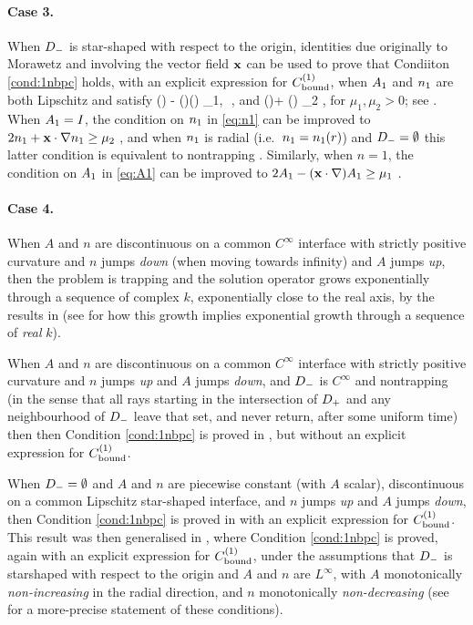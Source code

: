 \paragraph{Case 3.}
When $D_{-}$ is star-shaped with respect to the origin, identities due originally to Morawetz and involving the vector field $\mathbf{x}$ can be used to prove that Condiiton \ref{cond:1nbpc} holds, with an explicit expression for $C^{(1)}_{\rm bound}$, when $A_{1}$ and $n_{1}$ are both Lipschitz and satisfy
\beq\label{eq:A1}
\Ao(\bx) - (\bx\cdot\nabla)\Ao(\bx) \geq \mu_1,\,\, \bx\in \Dp,
\eeq
and 
\beq\label{eq:n1}
\no(\bx)+ \bx\cdot\nabla \no(\bx) \geq \mu_2 \quad{}\bx\in \Dp,
\eeq
for $\mu_1, \mu_2>0$;
see \cite[Theorem 2.5]{GrPeSp:19}. When $A_{1}= I$, the condition on $n_{1}$ in \eqref{eq:n1} can be improved to $2n_{1} + \mathbf{x} \cdot \nabla n_{1} \geq \mu_2$ \cite[Theorem 2.19(ii)]{GrPeSp:19}, and when $n_{1}$ is radial (i.e.~$n_{1}= n_{1}(r)$) and $D_{-}=\emptyset$ this latter condition is equivalent to nontrapping \cite[Theorem 7.7]{GrPeSp:19}.
Similarly, when $n= 1$, the condition on $A_{1}$ in \eqref{eq:A1} can be improved to $2A_{1} - (\mathbf{x}\cdot\nabla)A_{1} \geq \mu_1$
\cite[Theorem 2.19(i)]{GrPeSp:19}.

\paragraph{Case 4.}
When $A$ and $n$ are discontinuous on a common $C^\infty$ interface with strictly positive curvature and $n$ jumps \emph{down} (when moving towards infinity) and $A$ jumps \emph{up}, then the problem is trapping and the solution operator grows exponentially through a sequence of complex $k$, exponentially close to the real axis, by the results in \cite{PoVo:99a} (see \cite[\S6]{MoSp:19} for how this growth implies exponential growth through a sequence of \emph{real} $k$).

When $A$ and $n$ are discontinuous on a common $C^\infty$ interface with strictly positive curvature and $n$ jumps \emph{up} and $A$ jumps \emph{down}, and $D_{-}$ is 
$C^\infty$ and nontrapping (in the sense that all rays starting in the intersection of $D_{+}$ and any neighbourhood of $D_{-}$ leave that set, and never return, after some uniform time) then
then Condition \ref{cond:1nbpc} is proved in \cite{CaPoVo:99}, but without an explicit expression for $C^{(1)}_{\rm bound}$.

When $D_{-}=\emptyset$ and $A$ and $n$ are piecewise constant (with $A$ scalar), discontinuous on a common Lipschitz star-shaped interface, and $n$ jumps \emph{up} and $A$ jumps \emph{down}, then Condition \ref{cond:1nbpc} is proved in \cite{MoSp:19} with an explicit expression for $C^{(1)}_{\rm bound}$. 
This result was then generalised in \cite[Theorem 2.7]{GrPeSp:19}, where 
Condition \ref{cond:1nbpc} is proved, again with an explicit expression for $C^{(1)}_{\rm bound}$, under the assumptions that $D_{-}$ is starshaped with respect to the origin and $A$ and $n$ are $L^\infty$, with $A$ monotonically \emph{non-increasing} in the radial direction, and $n$ monotonically \emph{non-decreasing} (see \cite[Condition 2.6]{GrPeSp:19} for a more-precise statement of these conditions).


